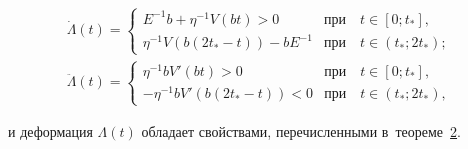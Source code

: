 \begin{equation}

\label{kho:eq15}

\begin{array}{l}

\dot{\Lambda}(t)=

\begin{cases}

E^{-1}b+\eta^{-1}V(bt)>0 & \text{при~~ } t\in[0;t_\ast],\\

\eta^{-1}V(b(2t_\ast-t))-bE^{-1} & \text{при~~ } t\in(t_\ast;2t_\ast);

\end{cases}

\\[4mm]

\ddot{\Lambda}(t)=

\begin{cases}

\eta^{-1}bV'(bt)>0 &\text{при~~ } t\in[0;t_\ast],\\

-\eta^{-1}bV'(b(2t_\ast-t))<0 &\text{при~~ } t\in(t_\ast;2t_\ast),

\end{cases}

\end{array}

\end{equation}

и деформация $\Lambda(t)$ обладает свойствами, перечисленными в~теореме~\hyperlink{kh:th2}{2}. 



\smallskip



\hypertarget{kh:th2}{} 



